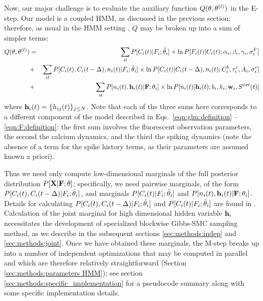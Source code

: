 Now, our major challenge is to evaluate the auxiliary function $Q(\mathbf{\theta},\mathbf{\theta}^{(l)})$ in the E-step. Our model is a coupled HMM, as discussed in the previous section; therefore, as usual in the HMM setting \cite{RAB89}, $Q$ may be broken up into a sum of simpler terms: 
\begin{eqnarray} 
Q(\mathbf{\theta},\mathbf{\theta}^{(l)}) 
&=& \sum_{it} P[C_i(t) | F_i; \tilde{\mathbf{\theta}}_i] \times \ln P[F_i(t)|C_i(t); \alpha_i, \beta_i, \gamma_i, \sigma^F_i] \nonumber \\ 
&+& \sum_{it} P[C_i(t), C_i(t-\Delta), n_i(t) | F_i; \tilde{\mathbf{\theta}}_i] \times \ln P[C_i(t)|C_i(t-\Delta), n_i(t); C^b_i, \tau^c_i, A_i, \sigma^c_i] \nonumber \\ 
&+& \sum_{it} P[n_i(t), \mathbf{h}_i(t) | {\bf F}; \mathbf{\theta}_i] \times \ln P[n_i(t)| \mathbf{h}_i(t); b_i, k_i, \mathbf{w}_i, S^{ext}(t)] 
\label{eqn:loglik:definition-expl} 
\end{eqnarray} 
\noindent where $\mathbf{h}_i(t)=\{h_{ij}(t)\}_{j \leq N}$. Note that each of the three sums here corresponds to a different component of the model described in Eqs.~\eqref{eqn:glm:definition} -- \eqref{eqn:F:definition}: the first sum involves the fluorescent observation parameters, the second the calcium dynamics, and the third the spiking dynamics (note the absence of a term for the spike history terms, as their parameters are assumed known a priori).

Thus we need only compute low-dimensional marginals of the full posterior distribution $P[{\bf X} | {\bf F}; \mathbf{\theta}]$; specifically, we need pairwise marginals, of the form $P[C_i(t), C_i(t- \Delta) | F_i; \tilde{\mathbf{\theta}}_i]$, and marginals $P[C_i(t)|F_i;\tilde{\mathbf{\theta}}_i]$ and $P[n_i(t),\mathbf{h}_i(t)|{\bf F};\mathbf{\theta}_i]$. Details for calculating $P[C_i(t), C_i(t- \Delta) | F_i; \tilde{\mathbf{\theta}}_i]$ and $P[C_i(t)|F_i;\tilde{\mathbf{\theta}}_i]$ are found in \cite{Vogelstein2009}. Calculation of the joint marginal for high dimensional hidden variable $\mathbf{h}_i$ necessitates the development of specialized blockwise Gibbs-SMC sampling method, as we describe in the subsequent sections \ref{sec:methods:indep} and \ref{sec:methods:joint}. Once we have obtained these marginals, the M-step breaks up into a number of independent optimizations that may be computed in parallel and which are therefore relatively straightforward (Section \ref{sec:methods:parameters HMM}); see section \ref{sec:methods:specific_implementation} for a pseudocode summary along with some specific implementation details.

